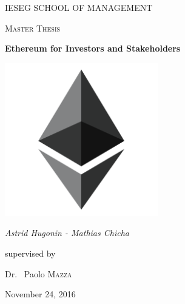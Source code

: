 \documentclass[11pt]{report}
\begin{document}
\begin{titlepage}
	\centering
	{\scshape\LARGE IESEG SCHOOL OF MANAGEMENT \par}
	\vspace{1cm}
	{\scshape\Large Master Thesis\par}
	\vspace{1.5cm}
	{\huge\bfseries Ethereum for Investors and Stakeholders\par}
	\vspace{2cm}
	\includegraphics[width=0.5\textwidth]{Introduction/Ethereum}\par\vspace{1cm}
	{\Large\itshape Astrid Hugonin - Mathias Chicha\par}
	\vfill
	supervised by\par
	Dr.~ Paolo \textsc{Mazza}
	\vfill

	{\large November 24, 2016\par}
\end{titlepage}
\end{document}
